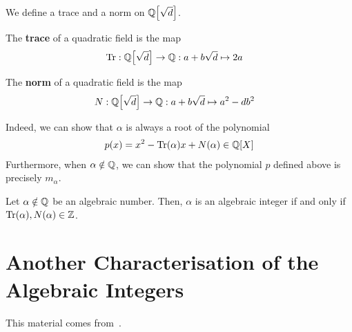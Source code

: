 We define a trace and a norm on $\mathbb{Q}\!\left[ \sqrt{d} \right]$.

\begin{boxdefinition}[Trace]
    The \textbf{trace} of a quadratic field is the map
    \begin{align*}
        \operatorname{Tr} : \mathbb{Q}\!\left[ \sqrt{d} \right] &\to \mathbb{Q} : a + b\sqrt{d} \mapsto 2a
    \end{align*}
\end{boxdefinition}

\begin{boxdefinition}[Norm]
    The \textbf{norm} of a quadratic field is the map
    \begin{align*}
        N : \mathbb{Q}\!\left[ \sqrt{d} \right] &\to \mathbb{Q} : a + b\sqrt{d} \mapsto a^2 - db^2
    \end{align*}
\end{boxdefinition}

Indeed, we can show that $\alpha$ is always a root of the polynomial
\begin{align*}
    p(x) = x^2 - \operatorname{Tr}(\alpha) x + N(\alpha) \in \mathbb{Q}\!\left[ X \right]
\end{align*}
Furthermore, when $\alpha \notin \mathbb{Q}$, we can show that the polynomial $p$ defined above is precisely $m_{\alpha}$.

\begin{boxproposition}
    Let $\alpha \notin \mathbb{Q}$ be an algebraic number. Then, $\alpha$ is an algebraic integer if and only if $\operatorname{Tr}(\alpha), N(\alpha) \in \mathbb{Z}$.
\end{boxproposition}

\section{Another Characterisation of the Algebraic Integers}

This material comes from~\cite[\S 2.2]{GeorgeBoxer}.

